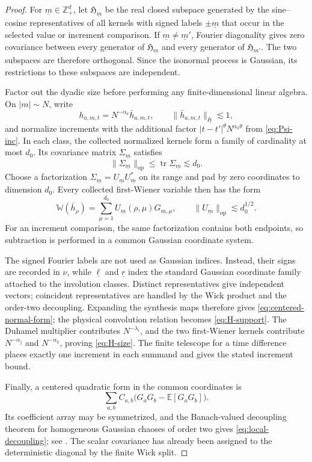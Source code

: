\documentclass[11pt,reqno]{amsart}
\numberwithin{equation}{section}
\theoremstyle{plain}
\theoremstyle{definition}
\newcommand{\Z}{\mathbb Z}
\newcommand{\E}{\mathbb E}
\newcommand{\op}{\operatorname{op}}
\newcommand{\isoW}{\mathbb W}
\begin{document}
\begin{proof}
For \(\underline m\in\Z^d_+\), let \(\mathfrak H_{\underline m}\) be the real
closed subspace generated by the sine--cosine representatives of all
kernels with signed labels \(\pm\underline m\) that occur in the selected
value or increment comparison.  If \(\underline m\ne\underline m'\),
Fourier diagonality gives zero covariance between every generator of
\(\mathfrak H_{\underline m}\) and every generator of
\(\mathfrak H_{\underline m'}\).  The two subspaces are therefore
orthogonal.  Since the isonormal process is Gaussian, its restrictions to
these subspaces are independent.

Factor out the dyadic size before performing any finite-dimensional linear
algebra.  On \(|m|\sim N\), write
\[
        h_{a,m,t}=N^{-\alpha_a}\bar h_{a,m,t},
        \qquad \|\bar h_{a,m,t}\|_{\mathfrak H}\lesssim1,
\]
and normalize increments with the additional factor
\(|t-t'|^\theta N^{\alpha_a\theta}\) from \eqref{eq:Psi-inc}.  In each
class, the collected normalized kernels form a family of cardinality at
most \(d_0\).  Its covariance matrix \(\Sigma_{\underline m}\) satisfies
\[
        \|\Sigma_{\underline m}\|_{\op}
        \le\operatorname{tr}\Sigma_{\underline m}\lesssim d_0.
\]
Choose a factorization
\(\Sigma_{\underline m}=U_{\underline m}U_{\underline m}^*\) on its range
and pad by zero coordinates to dimension \(d_0\).  Every collected
first-Wiener variable then has the form
\[
        \isoW(\bar h_\rho)
        =\sum_{\mu=1}^{d_0}
          U_{\underline m}(\rho,\mu)G_{\underline m,\mu},
        \qquad \|U_{\underline m}\|_{\op}\lesssim d_0^{1/2}.
\]
For an increment comparison, the same factorization contains both
endpoints, so subtraction is performed in a common Gaussian coordinate
system.

The signed Fourier labels are not used as Gaussian indices.  Instead, their
signs are recorded in \(\nu\), while \(\underline\ell\) and
\(\underline r\) index the standard Gaussian coordinate family attached
to the involution classes.  Distinct representatives give independent
vectors; coincident representatives are handled by the Wick product and the
order-two decoupling.  Expanding the synthesis maps therefore gives
\eqref{eq:centered-normal-form}; the physical convolution relation becomes
\eqref{eq:H-support}.  The Duhamel multiplier contributes
\(N^{-\lambda_i}\), and the two first-Wiener kernels contribute
\(N^{-\alpha_j}\) and \(N^{-\alpha_k}\), proving
\eqref{eq:H-size}.  The finite telescope for a time difference places
exactly one increment in each summand and gives the stated increment bound.

Finally, a centered quadratic form in the common coordinates is
\[
        \sum_{a,b}C_{a,b}
        \bigl(G_aG_b-\E[G_aG_b]\bigr).
\]
Its coefficient array may be symmetrized, and the Banach-valued decoupling
theorem for homogeneous Gaussian chaoses of order two gives
\eqref{eq:local-decoupling}; see \cite{DeLaPenaGine}.  The scalar covariance
has already been assigned to the deterministic diagonal by the finite Wick
split.
\end{proof}
\end{document}
